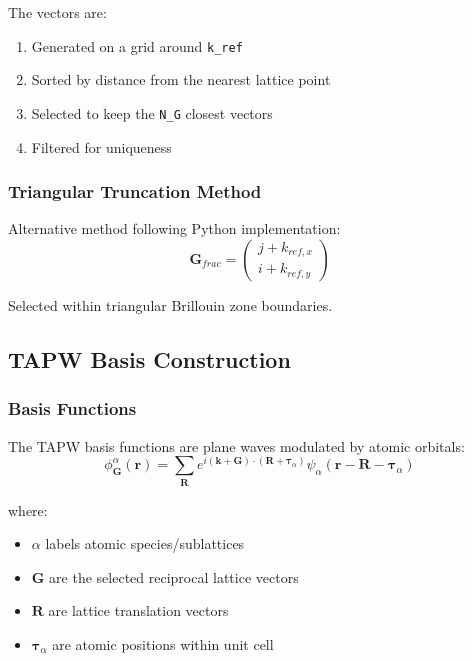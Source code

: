 \documentclass[11pt,a4paper]{article}
\begin{document}
The vectors are:
\begin{enumerate}
    \item Generated on a grid around \texttt{k\_ref}
    \item Sorted by distance from the nearest lattice point
    \item Selected to keep the \texttt{N\_G} closest vectors
    \item Filtered for uniqueness
\end{enumerate}

\subsubsection{Triangular Truncation Method}

Alternative method following Python implementation:
\begin{equation}
\mathbf{G}_{frac} = \begin{pmatrix} j + k_{ref,x} \\ i + k_{ref,y} \end{pmatrix}
\end{equation}

Selected within triangular Brillouin zone boundaries.

\subsection{TAPW Basis Construction}

\subsubsection{Basis Functions}

The TAPW basis functions are plane waves modulated by atomic orbitals:
\begin{equation}
\phi^{\alpha}_{\mathbf{G}}(\mathbf{r}) = \sum_{\mathbf{R}} e^{i(\mathbf{k} + \mathbf{G}) \cdot (\mathbf{R} + \boldsymbol{\tau}_\alpha)} \psi_\alpha(\mathbf{r} - \mathbf{R} - \boldsymbol{\tau}_\alpha)
\end{equation}

where:
\begin{itemize}
    \item $\alpha$ labels atomic species/sublattices
    \item $\mathbf{G}$ are the selected reciprocal lattice vectors
    \item $\mathbf{R}$ are lattice translation vectors
    \item $\boldsymbol{\tau}_\alpha$ are atomic positions within unit cell
\end{itemize}
\end{document}
